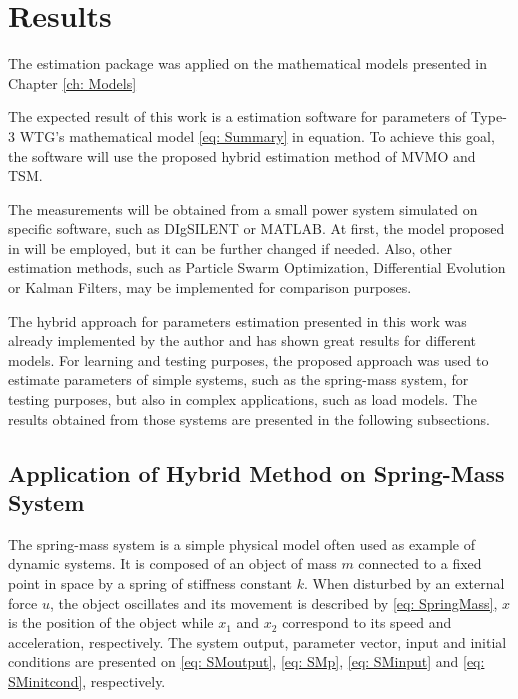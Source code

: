 \chapter{Results}
\label{ch: Results}

The estimation package was applied on the mathematical models presented in Chapter \ref{ch: Models}

The expected result of this work is a estimation software for parameters of Type-3 WTG's mathematical model \eqref{eq: Summary} in equation. To achieve this goal, the software will use the proposed hybrid estimation method of MVMO and TSM.

The measurements will be obtained from a small power system simulated on specific software, such as DIgSILENT or MATLAB. At first, the model proposed in \cite{Erlich2012} will be employed, but it can be further changed if needed. Also, other estimation methods, such as Particle Swarm Optimization, Differential Evolution or Kalman Filters, may be implemented for comparison purposes.

The hybrid approach for parameters estimation presented in this work was already implemented by the author and has shown great results for different models. For learning and testing purposes, the proposed approach was used to estimate parameters of simple systems, such as the spring-mass system, for testing purposes, but also in complex applications, such as load models. The results obtained from those systems are presented in the following subsections.

\section{Application of Hybrid Method on Spring-Mass System}

The spring-mass system is a simple physical model often used as example of dynamic systems. It is composed of an object of mass $m$ connected to a fixed point in space by a spring of stiffness constant $k$. When disturbed by an external force $u$, the object oscillates and its movement is described by \eqref{eq: SpringMass}, $x$ is the position of the object while $x_{1}$ and $x_{2}$ correspond to its speed and acceleration, respectively. The system output, parameter vector, input and initial conditions are presented on \eqref{eq: SMoutput}, \eqref{eq: SMp}, \eqref{eq: SMinput} and \eqref{eq: SMinitcond}, respectively.

